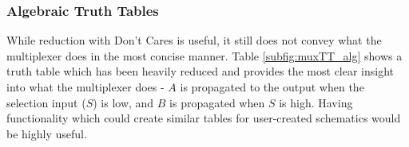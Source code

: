 \subsubsection{Algebraic Truth Tables}
While reduction with Don't Cares is useful, it still does not convey what the multiplexer does in the most concise manner. Table \ref{subfig:muxTT_alg} shows a truth table which has been heavily reduced and provides the most clear insight into what the multiplexer does - $A$ is propagated to the output when the selection input ($S$) is low, and $B$ is propagated when $S$ is high. Having functionality which could create similar tables for user-created schematics would be highly useful.

\begin{table}[h]
    \centering
    \medskip
    \medskip
    \caption{Truth Tables for a 2-bit Multiplexer}
    \label{tab:muxTTs}
\end{table}


